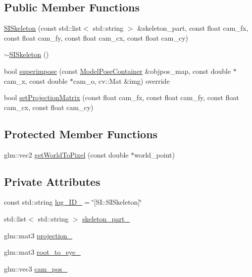 \subsection*{Public Member Functions}
\begin{DoxyCompactItemize}
\item 
\mbox{\hyperlink{classSISkeleton_a9d7925269e60716f5eba550ee6d5a148}{S\+I\+Skeleton}} (const std\+::list$<$ std\+::string $>$ \&skeleton\+\_\+part, const float cam\+\_\+fx, const float cam\+\_\+fy, const float cam\+\_\+cx, const float cam\+\_\+cy)
\item 
\mbox{\hyperlink{classSISkeleton_a6e9f780999700a4695d4ed487f2499b9}{$\sim$\+S\+I\+Skeleton}} ()
\item 
bool \mbox{\hyperlink{classSISkeleton_a3f49fa3419370c2597435768f280c747}{superimpose}} (const \mbox{\hyperlink{classSuperimpose_a178e3d4e2def6635bfcf9454dd4b5d22}{Model\+Pose\+Container}} \&objpos\+\_\+map, const double $\ast$cam\+\_\+x, const double $\ast$cam\+\_\+o, cv\+::\+Mat \&img) override
\item 
bool \mbox{\hyperlink{classSISkeleton_aa1f5e1a67363038821a5d514fb361a38}{set\+Projection\+Matrix}} (const float cam\+\_\+fx, const float cam\+\_\+fy, const float cam\+\_\+cx, const float cam\+\_\+cy)
\end{DoxyCompactItemize}
\subsection*{Protected Member Functions}
\begin{DoxyCompactItemize}
\item 
glm\+::vec2 \mbox{\hyperlink{classSISkeleton_adbd224633ac2e4c0285cf2cf760cc42a}{get\+World\+To\+Pixel}} (const double $\ast$world\+\_\+point)
\end{DoxyCompactItemize}
\subsection*{Private Attributes}
\begin{DoxyCompactItemize}
\item 
const std\+::string \mbox{\hyperlink{classSISkeleton_a6d4a9061880520792f467eb8e7faa66b}{log\+\_\+\+I\+D\+\_\+}} = \char`\"{}\mbox{[}S\+I\+::\+S\+I\+Skeleton\mbox{]}\char`\"{}
\item 
std\+::list$<$ std\+::string $>$ \mbox{\hyperlink{classSISkeleton_a9407c2f3b0889c2eda6f24120ea47559}{skeleton\+\_\+part\+\_\+}}
\item 
glm\+::mat3 \mbox{\hyperlink{classSISkeleton_a1ac569493d56bf099bdc364318ad5622}{projection\+\_\+}}
\item 
glm\+::mat3 \mbox{\hyperlink{classSISkeleton_a476442a8c9e9a1f4a703c3a84f0b83f1}{root\+\_\+to\+\_\+eye\+\_\+}}
\item 
glm\+::vec3 \mbox{\hyperlink{classSISkeleton_a63f1395d3e57e2d6a6d7de50928221a2}{cam\+\_\+pos\+\_\+}}
\end{DoxyCompactItemize}


